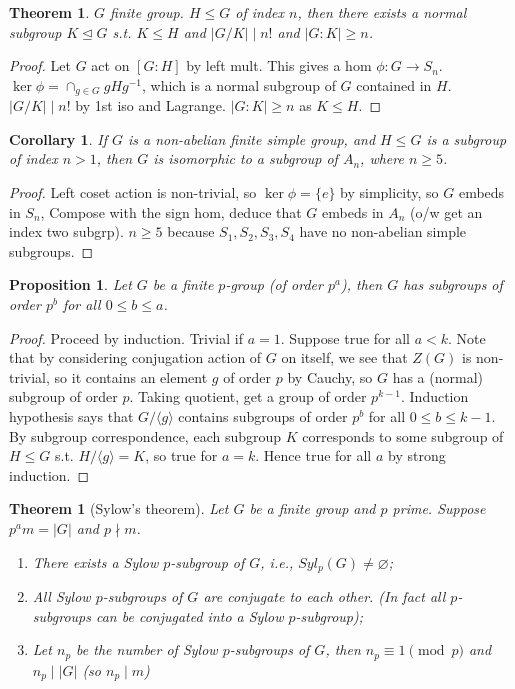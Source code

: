 \documentclass{article}
\theoremstyle{definition}
\theoremstyle{remark}
\theoremstyle{plain}
\newtheorem{thm}[defn]{Theorem}
\newtheorem{prop}[defn]{Proposition}
\newtheorem{crly}[defn]{Corollary}
\theoremstyle{definition}
\begin{document}
\begin{thm}
    $G$ finite group. $H\le G$ of index $n$, then there exists a normal subgroup $K\trianglelefteq G$ s.t. $K\le H$ and $|G/K|\mid n!$ and $|G:K|\ge n$.
\end{thm}
\begin{proof}
    Let $G$ act on $[G:H]$ by left mult. This gives a hom $\phi:G\to S_n$. $\ker\phi=\cap_{g\in G}gHg^{-1}$, which is a normal subgroup of $G$ contained in $H$. $|G/K|\mid n!$ by 1st iso and Lagrange. $|G:K|\ge n$ as $K\le H$.
\end{proof}
\begin{crly}
    If $G$ is a non-abelian finite simple group, and $H\le G$ is a subgroup of index $n>1$, then $G$ is isomorphic to a subgroup of $A_n$, where $n\ge 5$.
\end{crly}
\begin{proof}
    Left coset action is non-trivial, so $\ker\phi=\{e\}$ by simplicity, so $G$ embeds in $S_n$, Compose with the sign hom, deduce that $G$ embeds in $A_n$ (o/w get an index two subgrp). $n\ge 5$ because $S_1, S_2,S_3,S_4$ have no non-abelian simple subgroups.
\end{proof}
\begin{prop}
    Let $G$ be a finite $p$-group (of order $p^a$), then $G$ has subgroups of order $p^b$ for all $0\le b\le a$.
\end{prop}
\begin{proof}
    Proceed by induction. Trivial if $a=1$. Suppose true for all $a<k$. Note that by considering conjugation action of $G$ on itself, we see that $Z(G)$ is non-trivial, so it contains an element $g$ of order $p$ by Cauchy, so $G$ has a (normal) subgroup of order $p$. Taking quotient, get a group of order $p^{k-1}$. Induction hypothesis says that $G/\langle g\rangle$ contains subgroups of order $p^b$ for all $0\le b\le k-1$. By subgroup correspondence, each subgroup $K$ corresponds to some subgroup of $H\le G$ s.t. $H/\langle g\rangle=K$, so true for $a=k$. Hence true for all $a$ by strong induction.
\end{proof}
\begin{thm}[Sylow's theorem]
Let $G$ be a finite group and $p$ prime. Suppose $p^am=|G|$ and $p\nmid m$.
    \begin{enumerate}
        \item There exists a Sylow $p$-subgroup of $G$, i.e., $Syl_p(G)\neq\varnothing$;
        \item All Sylow $p$-subgroups of $G$ are conjugate to each other. (In fact all $p$-subgroups can be conjugated into a Sylow $p$-subgroup);
        \item Let $n_p$ be the number of Sylow $p$-subgroups of $G$, then $n_p\equiv 1\pmod{p}$ and $n_p\mid |G|$ (so $n_p\mid m$)
    \end{enumerate}
\end{thm}
\end{document}
